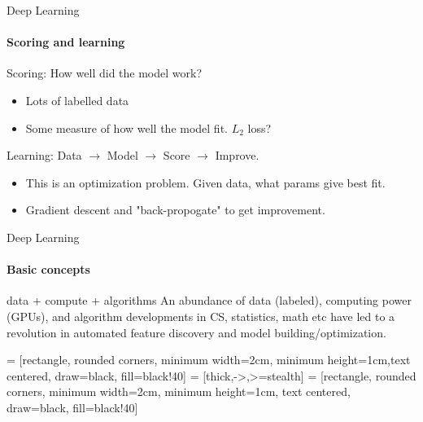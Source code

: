 \documentclass{beamer}
\begin{document}
\begin{darkframes}
    \begin{frame}{Deep Learning}
      \framesubtitle{Scoring and learning}
      \begin{block}
      {\small{Scoring: How well did the model work?}}
      \begin{itemize}
          \item Lots of labelled data
          \item Some measure of how well the model fit.  $L_2$ loss?
      \end{itemize}
      \end{block}
      \smallskip
      \begin{block}
      {\small{Learning:  Data $\xrightarrow{}$ Model $\xrightarrow{}$ Score $\xrightarrow{}$ Improve.}}
      \begin{itemize}
          \item This is an optimization problem.  Given data, what params give best fit.
          \item Gradient descent and "back-propogate" to get improvement.  
      \end{itemize}
      \end{block}
    \end{frame}
    
    \begin{frame}{Deep Learning}
      \framesubtitle{Basic concepts}
      \begin{block}
      {data + compute + algorithms}
        An abundance of data (labeled), computing power (GPUs), and algorithm developments in CS, statistics, math etc have led to a revolution in automated feature discovery and model building/optimization.
      \end{block}
      \bigskip
         = [rectangle, rounded corners, minimum width=2cm, minimum height=1cm,text centered, draw=black, fill=black!40]
         = [thick,->,>=stealth]
         = [rectangle, rounded corners, minimum width=2cm, minimum height=1cm, text centered, draw=black, fill=black!40]
      

\end{frame}
\end{darkframes}
\end{document}
